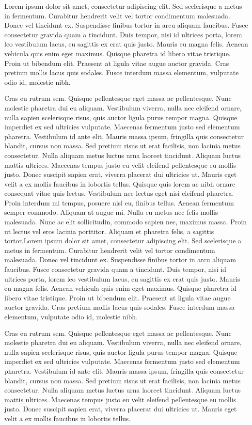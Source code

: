 \documentclass[10pt,twocolumn,twoside,slovak,a4paper]{article}
\begin{document}
Lorem ipsum dolor sit amet, consectetur adipiscing elit. Sed scelerisque a metus in fermentum. Curabitur hendrerit velit vel tortor condimentum malesuada. Donec vel tincidunt ex. Suspendisse finibus tortor in arcu aliquam faucibus. Fusce consectetur gravida quam a tincidunt. Duis tempor, nisi id ultrices porta, lorem leo vestibulum lacus, eu sagittis ex erat quis justo. Mauris eu magna felis. Aenean vehicula quis enim eget maximus. Quisque pharetra id libero vitae tristique. Proin ut bibendum elit. Praesent at ligula vitae augue auctor gravida. Cras pretium mollis lacus quis sodales. Fusce interdum massa elementum, vulputate odio id, molestie nibh.

Cras eu rutrum sem. Quisque pellentesque eget massa ac pellentesque. Nunc molestie pharetra dui eu aliquam. Vestibulum viverra, nulla nec eleifend ornare, nulla sapien scelerisque risus, quis auctor ligula purus tempor magna. Quisque imperdiet ex sed ultricies vulputate. Maecenas fermentum justo sed elementum pharetra. Vestibulum id ante elit. Mauris massa ipsum, fringilla quis consectetur blandit, cursus non massa. Sed pretium risus ut erat facilisis, non lacinia metus consectetur. Nulla aliquam metus luctus urna laoreet tincidunt. Aliquam luctus mattis ultrices. Maecenas tempus justo eu velit eleifend pellentesque eu mollis justo. Donec suscipit sapien erat, viverra placerat dui ultricies ut. Mauris eget velit a ex mollis faucibus in lobortis tellus.
Quisque quis lorem ac nibh ornare consequat vitae quis lectus. Vestibulum nec lectus eget nisi eleifend pharetra. Proin interdum mi tempus, posuere nisl eu, finibus tellus. Aenean fermentum semper commodo. Aliquam at augue mi. Nulla eu metus nec felis mollis malesuada. Nunc ac elit sollicitudin, commodo sapien nec, maximus massa. Proin ut lectus vel eros lacinia porttitor. Aliquam et pharetra felis, a sagittis tortor.Lorem ipsum dolor sit amet, consectetur adipiscing elit. Sed scelerisque a metus in fermentum. Curabitur hendrerit velit vel tortor condimentum malesuada. Donec vel tincidunt ex. Suspendisse finibus tortor in arcu aliquam faucibus. Fusce consectetur gravida quam a tincidunt. Duis tempor, nisi id ultrices porta, lorem leo vestibulum lacus, eu sagittis ex erat quis justo. Mauris eu magna felis. Aenean vehicula quis enim eget maximus. Quisque pharetra id libero vitae tristique. Proin ut bibendum elit. Praesent at ligula vitae augue auctor gravida. Cras pretium mollis lacus quis sodales. Fusce interdum massa elementum, vulputate odio id, molestie nibh.

Cras eu rutrum sem. Quisque pellentesque eget massa ac pellentesque. Nunc molestie pharetra dui eu aliquam. Vestibulum viverra, nulla nec eleifend ornare, nulla sapien scelerisque risus, quis auctor ligula purus tempor magna. Quisque imperdiet ex sed ultricies vulputate. Maecenas fermentum justo sed elementum pharetra. Vestibulum id ante elit. Mauris massa ipsum, fringilla quis consectetur blandit, cursus non massa. Sed pretium risus ut erat facilisis, non lacinia metus consectetur. Nulla aliquam metus luctus urna laoreet tincidunt. Aliquam luctus mattis ultrices. Maecenas tempus justo eu velit eleifend pellentesque eu mollis justo. Donec suscipit sapien erat, viverra placerat dui ultricies ut. Mauris eget velit a ex mollis faucibus in lobortis tellus.
\end{document}
